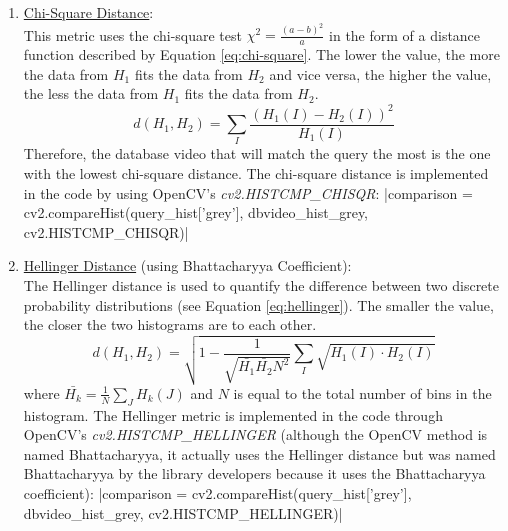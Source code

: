 \begin{enumerate}
    \item \underline{Chi-Square Distance}:\\ 
    This metric uses the chi-square test $\chi^2=\frac{(a-b)^2}{a}$ in the form of a distance function described by Equation \ref{eq:chi-square}. The lower the value, the more the data from $H_1$ fits the data from $H_2$ and vice versa, the higher the value, the less the data from $H_1$ fits the data from $H_2$.
    \begin{equation}
    \label{eq:chi-square}
        d(H_1,H_2)=\sum_I\frac{(H_1(I)-H_2(I))^2}{H_1(I)}
    \end{equation}
    Therefore, the database video that will match the query the most is the one with the lowest chi-square distance. The chi-square distance is implemented in the code by using OpenCV's \textit{cv2.HISTCMP\_CHISQR}:
    |comparison = cv2.compareHist(query_hist['grey'], dbvideo_hist_grey, cv2.HISTCMP_CHISQR)|
    
    
    \item \underline{Hellinger Distance} (using Bhattacharyya Coefficient):\\
    The Hellinger distance is used to quantify the difference between two discrete probability distributions (see Equation \ref{eq:hellinger}). The smaller the value, the closer the two histograms are to each other.
    \begin{equation}
    \label{eq:hellinger}
        d(H_1,H_2)=\sqrt{1-\frac{1}{\sqrt{\bar{H_1}\bar{H_2}N^2}}\sum_I\sqrt{H_1(I)\cdot H_2(I)}}
    \end{equation}
    where $\bar{H_k}=\frac{1}{N}\sum_JH_k(J)$ and $N$ is equal to the total number of bins in the histogram. The Hellinger metric is implemented in the code through OpenCV's \textit{cv2.HISTCMP\_HELLINGER} (although the OpenCV method is named Bhattacharyya, it actually uses the Hellinger distance but was named Bhattacharyya by the library developers because it uses the Bhattacharyya coefficient):
    |comparison = cv2.compareHist(query_hist['grey'], dbvideo_hist_grey, cv2.HISTCMP_HELLINGER)|
    

\end{enumerate}
